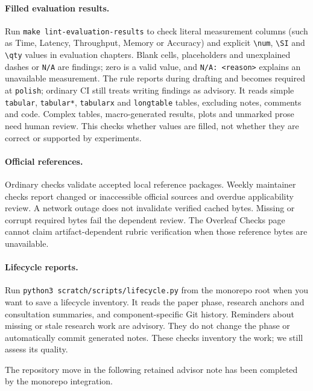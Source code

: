 \paragraph{Filled evaluation results.} Run \texttt{make lint-evaluation-results} to check literal measurement columns (such as Time, Latency, Throughput, Memory or Accuracy) and explicit \texttt{\textbackslash num}, \texttt{\textbackslash SI} and \texttt{\textbackslash qty} values in evaluation chapters. Blank cells, placeholders and unexplained dashes or \texttt{N/A} are findings; zero is a valid value, and \texttt{N/A: <reason>} explains an unavailable measurement. The rule reports during drafting and becomes required at \texttt{polish}; ordinary CI still treats writing findings as advisory. It reads simple \texttt{tabular}, \texttt{tabular*}, \texttt{tabularx} and \texttt{longtable} tables, excluding notes, comments and code. Complex tables, macro-generated results, plots and unmarked prose need human review. This checks whether values are filled, not whether they are correct or supported by experiments.

\paragraph{Official references.} Ordinary checks validate accepted local reference packages. Weekly maintainer checks report changed or inaccessible official sources and overdue applicability review. A network outage does not invalidate verified cached bytes. Missing or corrupt required bytes fail the dependent review. The Overleaf Checks page cannot claim artifact-dependent rubric verification when those reference bytes are unavailable.

\paragraph{Lifecycle reports.} Run \texttt{python3 scratch/scripts/lifecycle.py} from the monorepo root when you want to save a lifecycle inventory. It reads the paper phase, research anchors and consultation summaries, and component-specific Git history. Reminders about missing or stale research work are advisory. They do not change the phase or automatically commit generated notes. These checks inventory the work; we still assess its quality.

The repository move in the following retained advisor note has been completed by the monorepo integration.

